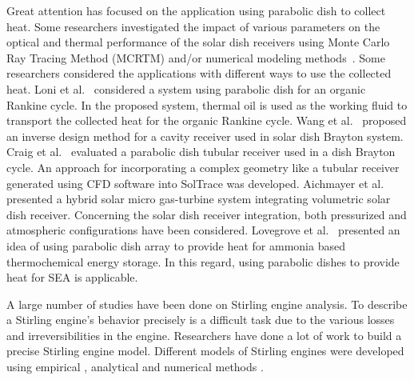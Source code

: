 \documentclass[review,3p,10t]{elsarticle}
\begin{document}
Great attention has focused on the application using parabolic dish to collect heat. Some researchers investigated the impact of various parameters on the optical and thermal performance of the solar dish receivers using Monte Carlo Ray Tracing Method (MCRTM) and/or numerical modeling methods~\cite{Cheng2013,Mao2014,Wang2010,Wang2013,Zhu2015,Sha2016,Daabo2016}. Some researchers considered the applications with different ways to use the collected heat. Loni et al.~\cite{Loni2016} considered a system using parabolic dish for an organic Rankine cycle. In the proposed system, thermal oil is used as the working fluid to transport the collected heat for the organic Rankine cycle. Wang et al.~\cite{Wang2014} proposed an inverse design method for a cavity receiver used in solar dish Brayton system. Craig et al.~\cite{Craig2016} evaluated a parabolic dish tubular receiver used in a dish Brayton cycle. An approach for incorporating a complex geometry like a tubular receiver generated using CFD software into SolTrace was developed. Aichmayer et al.~\cite{Aichmayer2015} presented a hybrid solar micro gas-turbine system integrating volumetric solar dish receiver. Concerning the solar dish receiver integration, both pressurized and atmospheric configurations have been considered. Lovegrove et al.~\cite{Lovegrove2004} presented an idea of using parabolic dish array to provide heat for ammonia based thermochemical energy storage. In this regard, using parabolic dishes to provide heat for SEA is applicable.

A large number of studies have been done on Stirling engine analysis. To describe a Stirling engine's behavior precisely is a difficult task due to the various losses and irreversibilities in the engine.
Researchers have done a lot of work to build a precise Stirling engine model. Different models of Stirling engines were developed using empirical%
, analytical
 and numerical methods
 .
\end{document}
